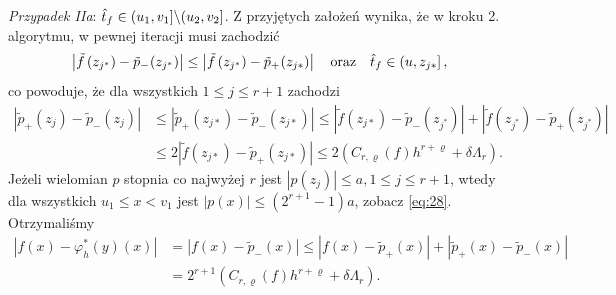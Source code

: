 \documentclass[oik, pdftex, man]{mgrwms}
\begin{document}
    \textit{Przypadek IIa}: $\hat{t}_{f} \in (u_{1}, v_{1}] \backslash (u_{2}, v_{2}]$.
    Z przyjętych założeń wynika, że w kroku 2. algorytmu, w pewnej iteracji musi zachodzić
    \begin{equation*}
        \left|\tilde{f}\left(z_{j^{*}}\right)-\tilde{p}_{-\!}\left(z_{j^{*}}\right)\right| \leq\left|\tilde{f}\left(z_{j^{*}}\right)-\tilde{p}_{+\!}\left(z_{j *}\right)\right| \quad \text{oraz} \quad \hat{t}_{f} \in\left(u, z_{j *}\right],
    \end{equation*}
    co powoduje, że dla wszystkich $1 \leq j \leq r+1$ zachodzi
    \begin{equation*}
        \begin{aligned}
            \left|\tilde{p}_{+}\left(z_{j}\right)-\tilde{p}_{-}\left(z_{j}\right)\right| & 
            \leq\left|\tilde{p}_{+}\left(z_{j *}\right)-\tilde{p}_{-}\left(z_{j *}\right)\right| \leq\left|\tilde{f}\left(z_{j *}\right)-\tilde{p}_{-}\left(z_{j^{*}}\right)\right|+\left|\tilde{f}\left(z_{j^{*}}\right)-\tilde{p}_{+}\left(z_{j^{*}}\right)\right| \\
            & \leq 2\left|\tilde{f}\left(z_{j *}\right)-\tilde{p}_{+}\left(z_{j *}\right)\right| \leq 2\left(C_{r, \varrho}(f) h^{r+\varrho}+\delta \Lambda_{r}\right).
        \end{aligned}
    \end{equation*}
    Jeżeli wielomian $p$ stopnia co najwyżej $r$ jest $\left|p\left(z_{j}\right)\right| \leq a, 1 \leq j \leq r+1$, wtedy dla wszystkich $u_{1} \leq x<v_{1}$ jest $|p(x)| \leq\left(2^{r+1}-1\right) a$, zobacz \eqref{eq:28}. Otrzymaliśmy
    \begin{equation*}
        \begin{aligned}
            \left|f(x)-\varphi_{h}^{*}(y)(x)\right| &=\left|f(x)-\tilde{p}_{-}(x)\right| \leq\left|f(x)-\tilde{p}_{+}(x)\right|+\left|\tilde{p}_{+}(x)-\tilde{p}_{-}(x)\right| \\
            &=2^{r+1}\left(C_{r, \varrho}(f) h^{r+\varrho}+\delta \Lambda_{r}\right).
        \end{aligned}
    \end{equation*}
\end{document}
